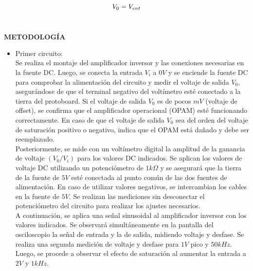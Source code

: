 \documentclass[12pt]{article}
\begin{document}
	\begin{equation}
		\notag V_0 = V_{ent}
	\end{equation}\\
	

	\newpage
	
	\begin{center}
		\textbf{\large METODOLOGÍA}\\
	\end{center}
	
	\begin{itemize}
		\item Primer circuito:\\
		
		Se realiza el montaje del amplificador inversor y las conexiones necesarias en la fuente DC. Luego, se conecta la entrada $V_i$ a $0V$ y se enciende la fuente DC para comprobar la alimentación del circuito y medir el voltaje de salida $V_0$, asegurándose de que el terminal negativo del voltímetro esté conectado a la tierra del protoboard. Si el voltaje de salida $V_0$ es de pocos $mV$ (voltaje de offset), se confirma que el amplificador operacional (OPAM) esté funcionando correctamente. En caso de que el voltaje de salida $V_0$ sea del orden del voltaje de saturación positivo o negativo, indica que el OPAM está dañado y debe ser reemplazado.\\
		
		Posteriormente, se mide con un voltímetro digital la amplitud de la ganancia de voltaje $(V_0/V_i)$ para los valores DC indicados. Se aplican los valores de voltaje DC utilizando un potenciómetro de $1k\Omega$ y se asegurará que la tierra de la fuente de $5V$ esté conectada al punto común de las dos fuentes de alimentación. En caso de utilizar valores negativos, se intercambian los cables en la fuente de $5V$. Se realizan las mediciones sin desconectar el potenciómetro del circuito para realizar los ajustes necesarios.\\
		
		A continuación, se aplica una señal sinusoidal al amplificador inversor con los valores indicados. Se observará simultáneamente en la pantalla del osciloscopio la señal de entrada y la de salida, midiendo voltaje y desfase. Se realiza una segunda medición de voltaje y desfase para $1V$ pico y $50kHz$.\\
		
		Luego, se procede a observar el efecto de saturación al aumentar la entrada a $2V$ y $1kHz$.\\
		

\end{itemize}
\end{document}
